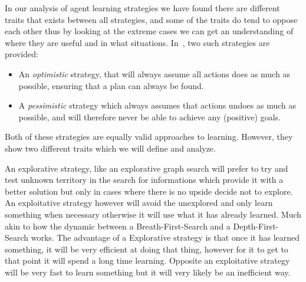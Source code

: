 \documentclass[\master/Master.tex]{subfiles}
\begin{document}
	In our analysis of agent learning strategies we have found there are different traits that exists between all strategies, and some of the traits do tend to oppose each other thus by looking at the extreme cases we can get an understanding of where they are useful and in what situations. In~\cite{Walsh2008}, two such strategies are provided:
    \begin{itemize}
    \item An \emph{optimistic} strategy, that will always assume all actions
    does as much as possible, ensuring that a plan can always be found.
    \item A \emph{pessimistic} strategy which always assumes that actions undoes
    as much as possible, and will therefore never be able to achieve any (positive)
    goals.
    \end{itemize}
    Both of these strategies are equally valid approaches to learning.
    However, they show two different traits which we will define and analyze.
    \begin{definition}
     An explorative strategy, like an explorative graph search will prefer to try and test unknown territory in the search for informations which provide it with a better solution but only in cases where there is no upside decide not to explore.
    An exploitative strategy however will avoid the unexplored and only learn something when necessary otherwise it will use what it has already learned. Much akin to how the dynamic between a Breath-First-Search and a Depth-First-Search works. The advantage of a Explorative strategy is that once it has learned something, it will be very efficient at doing that thing, however for it to get to that point it will spend a long time learning. Opposite an exploitative strategy will be very fast to learn something but it will very likely be an inefficient way.
	\end{definition}
\end{document}
